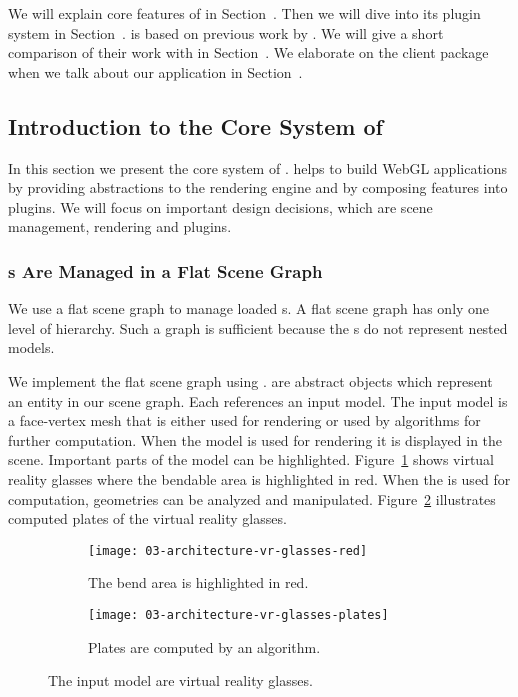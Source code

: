 \documentclass[../../ClassicThesis.tex]{subfiles}
\begin{document}
We will explain core features of {\convertify} in
Section~. Then we will dive into
its plugin system in Section~. {\convertify} is
based on previous work by \citet{bachelor-thesis}. We will give a
short comparison of their work with {\convertify} in
Section~. We elaborate on the client
package when we talk about our application {\platener} in
Section~.

\subsection{Introduction to the Core System of {\convertify}}
\label{sec:convertify-core-features}

In this section we present the core system of {\convertify}.
{\convertify} helps to build WebGL applications by providing
abstractions to the rendering engine and by composing
features into plugins. We will focus on important design
decisions, which are scene management, rendering and
plugins.

\subsubsection{{\threedmodel}s Are Managed in a Flat Scene
  Graph}

We use a flat scene graph to manage loaded {\stlfile}s. A
flat scene graph has only one level of hierarchy. Such a
graph is sufficient because the {\stlfile}s do not represent
nested models.

We implement the flat scene graph using .
 are abstract objects which represent an entity
in our scene graph. Each  references an input
model. The input model is a face-vertex mesh that is either
used for rendering or used by algorithms for further
computation. When the model is used for rendering it is
displayed in the scene. Important parts of the model can be
highlighted. Figure~\ref{fig:vr-glasses:red} shows virtual
reality glasses where the bendable area is highlighted in
red. When the {\threedmodel} is used for computation,
geometries can be analyzed and manipulated.
Figure~\ref{fig:vr-glasses:plates} illustrates computed
plates of the virtual reality glasses.

\begin{figure}[h]
  \centering
  \begin{subfigure}[b]{0.49\textwidth}
    \texttt{[image: 03-architecture-vr-glasses-red]}
    \caption{The bend area is highlighted in red.}
    \label{fig:vr-glasses:red}
  \end{subfigure}
  \begin{subfigure}[b]{0.49\textwidth}
    \texttt{[image: 03-architecture-vr-glasses-plates]}
    \caption{Plates are computed by an algorithm.}
    \label{fig:vr-glasses:plates}
  \end{subfigure}
  \caption{The input model are virtual reality glasses.}
  \label{fig:vr-glasses}
\end{figure}
\end{document}
